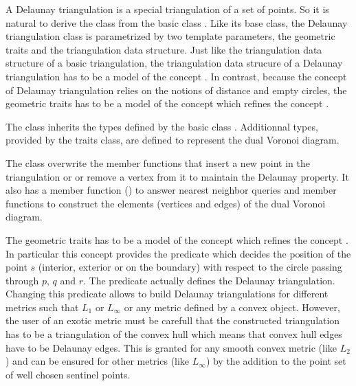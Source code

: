 A Delaunay triangulation is a special triangulation of a set of points.
So it is natural to derive  
the class 
from the basic class .
Like its base class, the Delaunay triangulation class is parametrized
by  two template 
parameters,  the geometric traits 
and the triangulation data structure.
Just like the triangulation  data structure
of a basic triangulation,
the triangulation data strucure  of a Delaunay triangulation
has to be a   model of the concept .
In contrast, because the
concept of Delaunay triangulation relies on the notions of
distance and  
empty circles, 
the geometric traits has to be a model of the concept
which refines the concept .




The class 
inherits the types defined by the 
basic class .
Additionnal types, provided by the traits class,
are defined to represent the dual Voronoi diagram.


The class 
overwrite the member functions that insert a new point
in the triangulation or
or remove a vertex  from it
to maintain the Delaunay property.
It also has a member function ()
to answer nearest neighbor queries
and member functions to construct the elements (vertices and edges)
of the dual Voronoi diagram.

The geometric traits has to be a model of the concept
which refines the concept .
In particular this concept provides
the  predicate
which decides the position of  the point $s$ (interior, exterior
or on the boundary) with respect to the circle
passing through $p$, $q$ and $r$. 
The 
predicate actually defines the Delaunay triangulation.
Changing this predicate 
allows to build Delaunay triangulations for different metrics
such that $L_1$ or $L_{\infty}$ or any metric defined by a
convex object. However, the user of an exotic metric
must be carefull that the constructed triangulation 
has to be a triangulation of the convex hull
which means that convex hull edges have to be Delaunay edges.
This is granted for any smooth convex metric (like $L_2$)
and can be ensured for other metrics (like  $L_{\infty}$)
by the addition to the point set of well chosen sentinel points.

